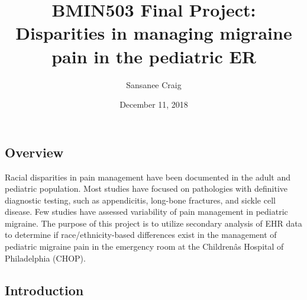 \documentclass[]{article}
\title{BMIN503 Final Project: Disparities in managing migraine pain in the
pediatric ER}
\author{Sansanee Craig}
\date{December 11, 2018}
\begin{document}
\maketitle

\subsection{Overview}\label{overview}

Racial disparities in pain management have been documented in the adult
and pediatric population. Most studies have focused on pathologies with
definitive diagnostic testing, such as appendicitis, long-bone
fractures, and sickle cell disease. Few studies have assessed
variability of pain management in pediatric migraine. The purpose of
this project is to utilize secondary analysis of EHR data to determine
if race/ethnicity-based differences exist in the management of pediatric
migraine pain in the emergency room at the Childrenâs Hospital of
Philadelphia (CHOP).

\subsection{Introduction}\label{introduction}
\end{document}
